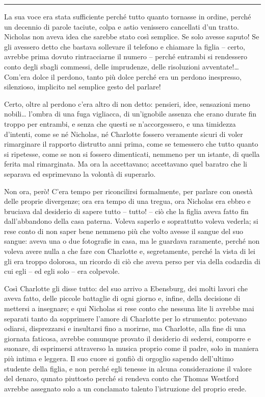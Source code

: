 \documentclass[a4paper,oneside,11pt]{memoir}
\begin{document}
\plainbreak{1}

La sua voce era stata sufficiente perché tutto quanto tornasse in ordine, perché un decennio di
parole taciute, colpa e astio venissero cancellati d'un tratto. Nicholas non aveva idea che sarebbe
stato così semplice. Se solo avesse saputo! Se gli avessero detto che bastava sollevare il telefono
e chiamare la figlia -- certo, avrebbe prima dovuto rintracciarne il numero -- perché entrambi si
rendessero conto degli sbagli commessi, delle imprudenze, delle risoluzioni avventate!\dots Com'era
dolce il perdono, tanto più dolce perché era un perdono inespresso, silenzioso, implicito nel
semplice gesto del parlare!

Certo, oltre al perdono c'era altro di non detto: pensieri, idee, sensazioni meno nobili\dots
l'ombra di una fuga vigliacca, di un'ignobile assenza che erano durate fin troppo per entrambi, e
senza che questi se n'accorgessero, e una timidezza d'intenti, come se né Nicholas, né Charlotte
fossero veramente sicuri di voler rimarginare il rapporto distrutto anni prima, come se temessero
che tutto quanto si ripetesse, come se non si fossero dimenticati, nemmeno per un istante, di quella
ferita mal rimarginata. Ma ora la accettavano; accettavano quel baratro che li separava ed
esprimevano la volontà di superarlo.

Non ora, però! C'era tempo per riconcilirsi formalmente, per parlare con onestà delle proprie
divergenze; ora era tempo di una tregua, ora Nicholas era ebbro e  bruciava dal desiderio di sapere
tutto -- tutto! -- ciò che la figlia aveva  fatto fin dall'abbandono della casa paterna. Voleva
saperlo e soprattutto voleva  vederla; si rese conto di non saper bene nemmeno più che volto avesse
il sangue  del suo sangue: aveva una o due fotografie in casa, ma le guardava raramente,  perché non
voleva avere nulla a che fare con Charlotte e, segretamente, perché  la vista di lei gli era troppo
dolorosa, un ricordo di ciò che aveva perso per  via della codardia di cui egli -- ed egli solo --
era colpevole.

Così Charlotte gli disse tutto: del suo arrivo a Ebensburg, dei molti lavori che  aveva fatto, delle
piccole battaglie di ogni giorno e, infine, della decisione  di mettersi a insegnare; e qui Nicholas
si rese conto che nessuna lite li  avrebbe mai separati tanto da sopprimere l'amore di Charlotte per
lo strumento:  potevano odiarsi, disprezzarsi e insultarsi fino a morirne, ma Charlotte, alla fine
di una giornata faticosa, avrebbe comunque provato il desiderio di sedersi,  comporre e suonare, di
esprimersi attraverso la musica proprio come il padre,  solo in maniera più intima e leggera. Il suo
cuore si gonfiò di orgoglio sapendo  dell'ultimo studente della figlia, e non perché egli tenesse in
alcuna considerazione il valore del denaro, qunato piuttosto perché si rendeva conto che Thomas
Westford avrebbe assegnato solo a un conclamato talento l'istruzione  del proprio erede.
\end{document}
